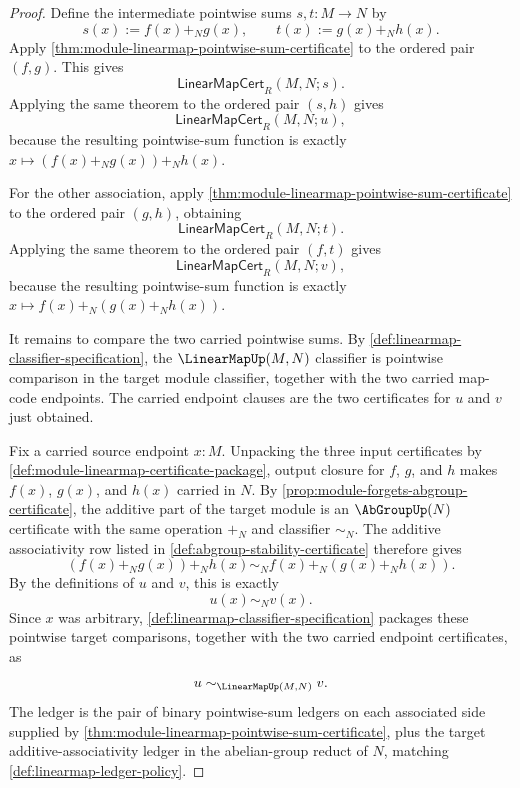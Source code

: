 \begin{proof}
Define the intermediate pointwise sums $s,t:M\to N$ by
$$
s(x):=f(x)+_N g(x),
\qquad
t(x):=g(x)+_N h(x).
$$
Apply \autoref{thm:module-linearmap-pointwise-sum-certificate} to the ordered pair $(f,g)$. This gives
$$
\mathsf{LinearMapCert}_R(M,N;s).
$$
Applying the same theorem to the ordered pair $(s,h)$ gives
$$
\mathsf{LinearMapCert}_R(M,N;u),
$$
because the resulting pointwise-sum function is exactly $x\mapsto (f(x)+_N g(x))+_N h(x)$.

For the other association, apply \autoref{thm:module-linearmap-pointwise-sum-certificate} to the ordered pair $(g,h)$, obtaining
$$
\mathsf{LinearMapCert}_R(M,N;t).
$$
Applying the same theorem to the ordered pair $(f,t)$ gives
$$
\mathsf{LinearMapCert}_R(M,N;v),
$$
because the resulting pointwise-sum function is exactly $x\mapsto f(x)+_N(g(x)+_N h(x))$.

It remains to compare the two carried pointwise sums. By \autoref{def:linearmap-classifier-specification}, the $\LinearMapUp(M,N)$ classifier is pointwise comparison in the target module classifier, together with the two carried map-code endpoints. The carried endpoint clauses are the two certificates for $u$ and $v$ just obtained.

Fix a carried source endpoint $x:M$. Unpacking the three input certificates by \autoref{def:module-linearmap-certificate-package}, output closure for $f$, $g$, and $h$ makes $f(x)$, $g(x)$, and $h(x)$ carried in $N$. By \autoref{prop:module-forgets-abgroup-certificate}, the additive part of the target module is an $\AbGroupUp(N)$ certificate with the same operation $+_N$ and classifier $\sim_N$. The additive associativity row listed in \autoref{def:abgroup-stability-certificate} therefore gives
$$
(f(x)+_N g(x))+_N h(x)\sim_N f(x)+_N(g(x)+_N h(x)).
$$
By the definitions of $u$ and $v$, this is exactly
$$
u(x)\sim_Nv(x).
$$
Since $x$ was arbitrary, \autoref{def:linearmap-classifier-specification} packages these pointwise target comparisons, together with the two carried endpoint certificates, as
$$
u\sim_{\LinearMapUp(M,N)}v.
$$
The ledger is the pair of binary pointwise-sum ledgers on each associated side supplied by \autoref{thm:module-linearmap-pointwise-sum-certificate}, plus the target additive-associativity ledger in the abelian-group reduct of $N$, matching \autoref{def:linearmap-ledger-policy}.
\end{proof}

